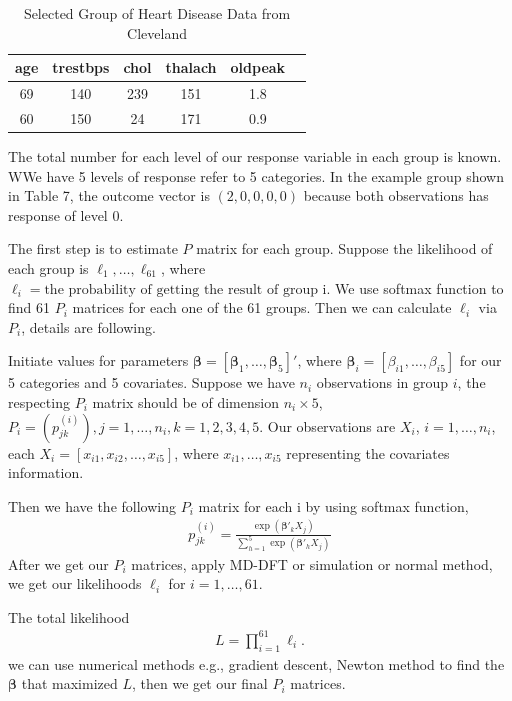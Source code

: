 \documentclass[12pt]{article}
\newcommand{\betavec}{{\boldsymbol{\beta}}}
\begin{document}
\begin{table}%
    \centering
\begin{tabular}{|c|c|c|c|c|c|}

\hline
     age & trestbps & chol & thalach & oldpeak\\
\hline
      69 &  140 & 239  &  151  & 1.8\\
\hline
    60  & 150 & 24 & 171 & 0.9\\
\hline
\end{tabular}
    \caption{Selected Group of Heart Disease Data from Cleveland}
    \label{tab:my_label}
\end{table}

The total number for each level of our response variable in each group is known. WWe have 5 levels of response refer to 5 categories. In the example group shown in Table 7, the outcome vector is $\left(2,0,0,0,0\right)$ because both observations has response of level 0.

The first step is to estimate $P$ matrix for each group. Suppose the likelihood of each group is $\ell_1 ,\dots, \ell_{61}$, where $\ell_i = \text{the probability of getting the result of group i}$. We use softmax function to find 61 $P_i$ matrices for each one of the 61 groups. Then we can calculate $\ell_i$ via $P_i$, details are following.


Initiate values for parameters $\betavec = \left[\betavec_1,\dots,\betavec_5 \right]'$, where $\betavec_i = \left[\beta_{i1},\dots,\beta_{i5} \right]$ for our 5 categories and 5 covariates. Suppose we have $n_i$ observations in group $i$, the respecting $P_i$ matrix should be of dimension $n_i \times 5$, $P_i = \left(p_{jk}^{(i)}\right), j=1,\dots, n_i, k = 1, 2, 3, 4, 5$. Our observations are $X_i$, $i= 1, \dots, n_i$, each $X_i = \left[x_{i1},x_{i2},\dots, x_{i5}\right]$, where $x_{i1}, \dots, x_{i5}$ representing the covariates information.


Then we have the following $P_i$ matrix for each i by using softmax function,
\begin{align*}
    p_{jk}^{(i)} = \frac{\exp(\betavec'_{k}X_j)}{\sum_{h=1}^{5}\exp(\betavec'_{h}X_j)}
\end{align*}
After we get our $P_i$ matrices, apply MD-DFT or simulation or normal method, we get our likelihoods $\ell_i$ for $i = 1,\dots, 61$.


The total likelihood 
\begin{align}
L = \prod_{i=1}^{61}\ell_i.  
\end{align}
we can use numerical methods e.g., gradient descent, Newton method to find the $\betavec$ that maximized $L$, then we get our final $P_i$ matrices.\\
\end{document}
